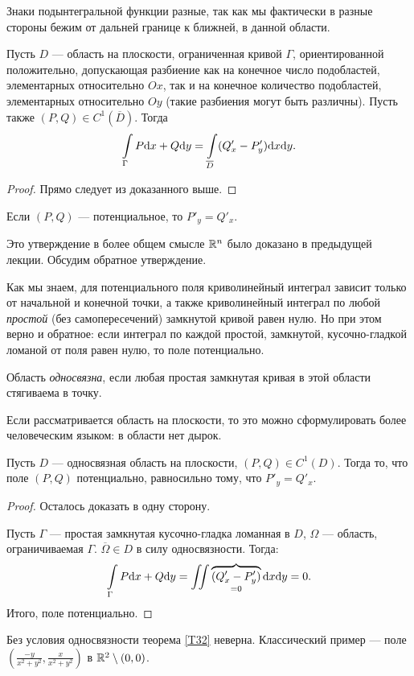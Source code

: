 Знаки подынтегральной функции разные, так как мы фактически в разные стороны бежим от дальней границе к ближней, в данной области.

\begin{Theorem}
Пусть $D$ --- область на плоскости, ограниченная кривой $\Gamma$,  ориентированной положительно, допускающая разбиение как на конечное число подобластей, элементарных относительно $Ox$, так и на конечное количество подобластей, элементарных относительно $Oy$ (такие разбиения могут быть различны). Пусть также $(P, Q) \in C^{1}(\overline{D})$. Тогда
$$
\int\limits_{\Gamma} P\mathrm{d}x + Q\mathrm{d}  y = \int\limits_{\overline{D}} (Q'_x - P'_y)\mathrm{d}x\mathrm{d} y.
$$
\end{Theorem}
\begin{proof}
Прямо следует из доказанного выше.
\end{proof}

\begin{Comment}
Если $(P, Q)$ --- потенциальное, то $P'_y = Q'_x$.
\end{Comment} 
 Это утверждение в более общем смысле $\mathbb{R}^n$ было доказано в предыдущей лекции. Обсудим обратное утверждение.


Как мы знаем, для потенциального поля криволинейный интеграл зависит только от начальной и конечной точки, а также криволинейный интеграл по любой \textit{простой} (без самопересечений) замкнутой кривой равен нулю. Но при этом верно и обратное: если интеграл по каждой простой, замкнутой, кусочно-гладкой ломаной от поля равен нулю, то поле потенциально.


\begin{Def}
Область \textit{односвязна}, если любая простая замкнутая кривая в этой области стягиваема в точку.
\end{Def}
Если рассматривается область на плоскости, то это можно сформулировать более человеческим языком: в области нет дырок.

\begin{Theorem}\label{T32}
Пусть $D$ --- односвязная область на плоскости, $(P, Q) \in C^1(D)$. Тогда то, что поле $(P, Q)$ потенциально, равносильно тому, что $P'_y = Q'_x$.
\end{Theorem}
\begin{proof}
Осталось доказать в одну сторону.

Пусть $\Gamma$ --- простая замкнутая кусочно-гладка ломанная в $D$, $\Omega$ --- область, ограничиваемая $\Gamma$. $\overline \Omega \in D$ в силу односвязности. Тогда: 
$$
\int\limits_{\Gamma} P\mathrm{d}x + Q\mathrm{d} y = \iint\overbrace{(Q'_x - P'_y)}_{=0}\mathrm{d}x \mathrm{d} y = 0.
$$
Итого, поле потенциально.
\end{proof}
Без условия односвязности теорема \ref{T32} неверна. Классический пример --- поле $(\frac{-y}{x^2+y^2}, \frac{x}{x^2+y^2})$ в $\mathbb{R}^2\setminus {(0, 0)}$.
